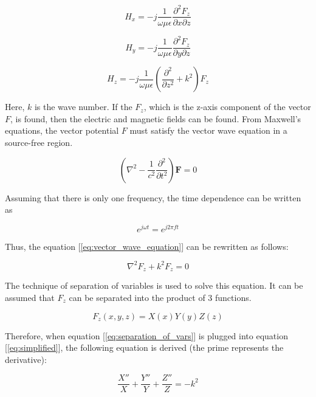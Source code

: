 \documentclass[a4paper,12pt]{report}
\begin{document}
\begin{equation}
  H_x = -j\frac{1}{\omega\mu\epsilon}\frac{\partial^2F_z}{\partial x \partial z}
\end{equation}

\begin{equation}
  H_y = -j\frac{1}{\omega\mu\epsilon}\frac{\partial^2F_z}{\partial y \partial z}
\end{equation}

\begin{equation}
  H_z = -j\frac{1}{\omega\mu\epsilon}(\frac{\partial^2}{\partial z^2} + k^2)F_z
\end{equation}

Here, $k$ is the wave number.
If the $F_z$, which is the z-axis component of the vector $F$, is found,
then the electric and magnetic fields can be found.
From Maxwell's equations, the vector potential $F$ must satisfy the vector wave equation
in a source-free region.

\begin{equation} \label{eq:vector_wave_equation}
  (\nabla^2 - \frac{1}{c^2}\frac{\partial^2}{\partial t^2})\boldsymbol{F} = 0
\end{equation}

Assuming that there is only one frequency, the time dependence can be written as

\begin{equation}
  e^{j\omega t} = e^{j 2\pi ft}
\end{equation}

Thus, the equation [\ref{eq:vector_wave_equation}] can be rewritten as follows:

\begin{equation} \label{eq:simplified}
  \nabla ^ 2 F_z + k^2 F_z = 0
\end{equation}

The technique of separation of variables is used to solve this equation.
It can be assumed that $F_z$ can be separated into the product of 3 functions.

\begin{equation} \label{eq:separation_of_vars}
  F_z(x,y,z) = X(x)Y(y)Z(z)
\end{equation}

Therefore, when equation [\ref{eq:separation_of_vars}] is plugged into equation [\ref{eq:simplified}],
the following equation is derived
(the prime represents the derivative):

\begin{equation} \label{eq:simplified_derivative_equation}
  \frac{X''}{X} + \frac{Y''}{Y} + \frac{Z''}{Z} = -k^2
\end{equation}
\end{document}
